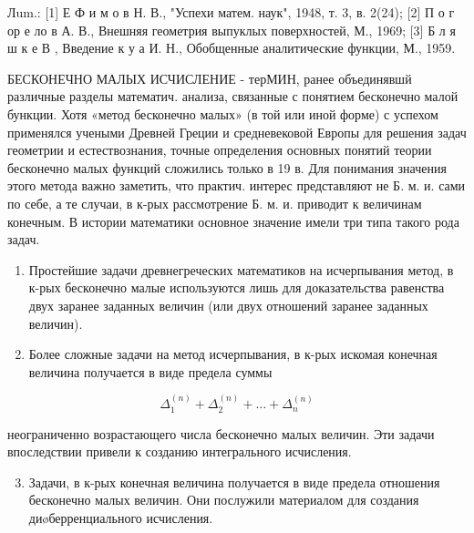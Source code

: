 \documentclass[10pt]{article}
\begin{document}
Лum.: [1] Е Ф и м о в Н. В., "Успехи матем. наук", 1948, т. 3, в. 2(24); [2] П о г ор е ло в А. В., Внешняя геометрия выпуклых поверхностей, М., 1969; [3] Б л я ш к е В , Введение к у а И. Н., Обобщенные аналитические функции, М., 1959.



БЕСКОНЕЧНО МАЛЫХ ИСЧИСЛЕНИЕ - терМИН, ранее объединявшй различные разделы математич. анализа, связанные с понятием бесконечно малой бункции. Хотя «метод бесконечно малых» (в той или иной форме) с успехом применялся учеными Древней Греции и средневековой Европы для решения задач геометрии и естествознания, точные определения основных понятий теории бесконечно малых функций сложились только в 19 в. Для понимания значения этого метода важно заметить, что практич. интерес представляют не Б. м. и. сами по себе, а те случаи, в к-рых рассмотрение Б. м. и. приводит к величинам конечным. В истории математики основное значение имели три типа такого рода задач.



\begin{enumerate}

  \item Простейшие задачи древнегреческих математиков на исчерпывания метод, в к-рых бесконечно малые используются лишь для доказательства равенства двух заранее заданных величин (или двух отношений заранее заданных величин).



  \item Более сложные задачи на метод исчерпывания, в к-рых искомая конечная величина получается в виде предела суммы



\end{enumerate}



\[

\Delta_{1}^{(n)}+\Delta_{2}^{(n)}+\ldots+\Delta_{n}^{(n)}

\]



неограниченно возрастающего числа бесконечно малых величин. Эти задачи впоследствии привели к созданию интегрального исчисления.



\begin{enumerate}

  \setcounter{enumi}{2}

  \item Задачи, в к-рых конечная величина получается в виде предела отношения бесконечно малых величин. Они послужили материалом для создания диøберренциального исчисления.

\end{enumerate}
\end{document}
